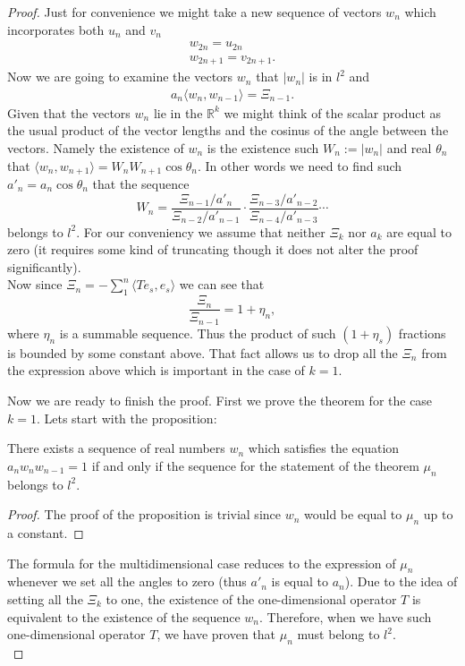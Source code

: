 \begin{proof}
    Just for convenience we might take a new sequence of vectors $w_n$ which incorporates both $u_n$ and $v_n$
    \begin{align*}
      w_{2n} = u_{2n}\\
      w_{2n + 1} = v_{2n + 1}.
    \end{align*}
    Now we are going to examine the vectors $w_n$ that $|w_n|$ is in $l^2$ and
    \begin{align*}
      a_{n} \langle w_{n}, w_{n - 1}\rangle = \Xi_{n - 1}.
    \end{align*}
    Given that the vectors $w_n$ lie in the $\mathbb{R}^k$ we might think of the scalar product as
    the usual product of the vector lengths and the cosinus of the angle between the vectors.
    Namely the existence of $w_n$ is the existence such $W_n := |w_n|$ and real $\theta_n$ that
    $\langle w_{n}, w_{n+1}\rangle = W_n W_{n+1} \cos{\theta_n}.$
    In other words we need to find such $a'_n = a_n \cos{\theta_n}$ that
    the sequence
    \[
      W_n = \frac{\Xi_{n-1}/a'_n}{\Xi_{n-2}/a'_{n-1}} \cdot \frac{\Xi_{n-3}/a'_{n-2}}{\Xi_{n-4}/a'_{n-3}} \cdots
    \]
    belongs to $l^2$. For our conveniency we assume that neither $\Xi_k$ nor $a_k$ are equal to zero (it requires some kind of truncating though it does not alter the proof significantly).\\
    Now since $\Xi_n = -\sum_1^n \langle Te_s, e_s\rangle$ we can see that
    \[
      \frac{\Xi_n}{\Xi_{n-1}} = 1 + \eta_n,
    \]
      where $\eta_n$ is a summable sequence.
    Thus the product of such $(1 + \eta_s)$ fractions is bounded by some constant above.
    That fact allows us to drop all the $\Xi_n$ from the expression above which is important in the case of $k = 1$.
    
    Now we are ready to finish the proof.
    First we prove the theorem for the case $k=1$. Lets start with the proposition:
    \begin{prop}
      There exists a sequence of real numbers $w_n$ which satisfies the equation $a_n w_n w_{n-1} = 1$ if and
      only if the sequence for the statement of the theorem $\mu_n$ belongs to $l^2$.
    \end{prop}
    \begin{proof}
      The proof of the proposition is trivial since $w_n$ would be equal to $\mu_n$ up to a constant.
    \end{proof}
    The formula for the multidimensional case reduces to the expression of $\mu_n$ whenever we
      set all the angles to zero (thus $a'_n$ is equal to $a_n$).
    Due to the idea of setting all the $\Xi_k$ to one, the existence of the one-dimensional operator $T$ is equivalent to the existence of the sequence $w_n$.
    Therefore, when we have such one-dimensional operator $T$, we have proven that $\mu_n$ must belong to $l^2$.\\
    

\end{proof}
